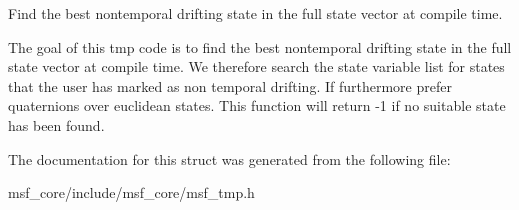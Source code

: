 Find the best nontemporal drifting state in the full state vector at compile time. 

The goal of this tmp code is to find the best nontemporal drifting state in the full state vector at compile time. We therefore search the state variable list for states that the user has marked as non temporal drifting. If furthermore prefer quaternions over euclidean states. This function will return -\/1 if no suitable state has been found. 

The documentation for this struct was generated from the following file\-:\begin{DoxyCompactItemize}
\item 
msf\-\_\-core/include/msf\-\_\-core/msf\-\_\-tmp.\-h\end{DoxyCompactItemize}
